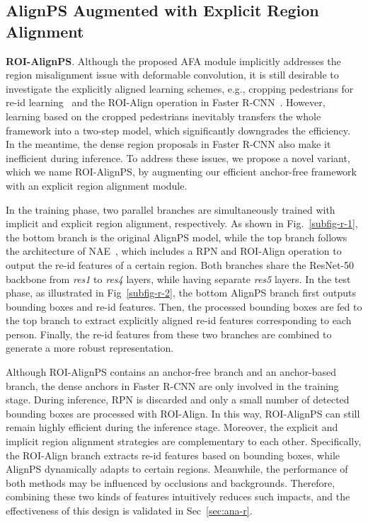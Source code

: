 \documentclass[journal]{IEEEtran}
\begin{document}
\subsection{AlignPS Augmented with Explicit Region Alignment}\label{sec:mls}
\textbf{ROI-AlignPS}. Although the proposed AFA module implicitly addresses the region misalignment issue with deformable convolution, it is still desirable to investigate the explicitly aligned learning schemes, e.g., cropping pedestrians for re-id learning~\cite{DBLP:conf/cvpr/ZhengZSCYT17,DBLP:conf/eccv/ChenZOYT18} and the ROI-Align operation in Faster R-CNN~\cite{DBLP:conf/cvpr/XiaoLWLW17,DBLP:conf/cvpr/ChenZYS20}. However, learning based on the cropped pedestrians inevitably transfers the whole framework into a two-step model, which significantly downgrades the efficiency. In the meantime, the dense region proposals in Faster R-CNN also make it inefficient during inference. To address these issues, we propose a novel variant, which we name ROI-AlignPS, by augmenting our efficient anchor-free framework with an explicit region alignment module. 

In the training phase, two parallel branches are simultaneously trained with implicit and explicit region alignment, respectively. As shown in Fig.~\ref{subfig-r-1}, the bottom branch is the original AlignPS model, while the top branch follows the architecture of NAE~\cite{DBLP:conf/cvpr/ChenZYS20}, which includes a RPN and ROI-Align operation to output the re-id features of a certain region. Both branches share the ResNet-50 backbone from \textit{res1} to \textit{res4} layers, while having separate \textit{res5} layers. In the test phase, as illustrated in Fig~\ref{subfig-r-2}, the bottom AlignPS branch first outputs bounding boxes and re-id features. Then, the processed bounding boxes are fed to the top branch to extract explicitly aligned re-id features corresponding to each person. Finally, the re-id features from these two branches are combined to generate a more robust representation.

Although ROI-AlignPS contains an anchor-free branch and an anchor-based branch, the dense anchors in Faster R-CNN are only involved in the training stage. During inference, RPN is discarded and only a small number of detected bounding boxes are processed with ROI-Align. In this way, ROI-AlignPS can still remain highly efficient during the inference stage. Moreover, the explicit and implicit region alignment strategies are complementary to each other. Specifically, the ROI-Align branch extracts re-id features based on bounding boxes, while AlignPS dynamically adapts to certain regions. Meanwhile, the performance of both methods may be influenced by occlusions and backgrounds. Therefore, combining these two kinds of features intuitively reduces such impacts, and the effectiveness of this design is validated in Sec~\ref{sec:ana-r}.
\end{document}

